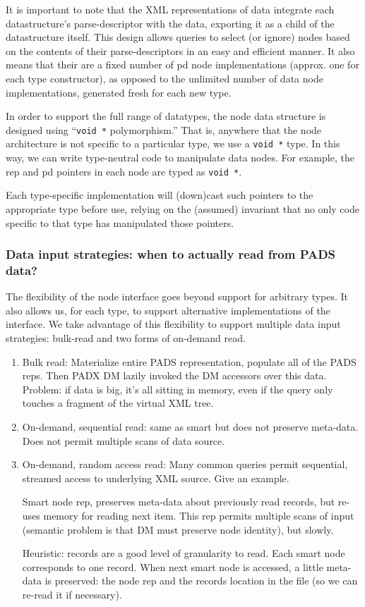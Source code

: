 It is important to note that the XML representations of \pads data
integrate each datastructure's parse-descriptor with the data,
exporting it as a child of the datastructure itself. This design
allows queries to select (or ignore) nodes based on the contents of
their parse-descriptors in an easy and efficient manner. It also means
that their are a fixed number of pd node implementations (approx. one for
each type constructor), as opposed to the unlimited number of data
node implementations, generated fresh for each new \pads{} type.

In order to support the full range of \pads datatypes,
the node data structure is designed using ``{\tt void *}
polymorphism.'' That is, anywhere that the node architecture is not
specific to a particular type, we use a {\tt void *} type. In this
way, we can write type-neutral code to manipulate data nodes. For
example, the rep and pd pointers in each node are typed as {\tt void
  *}. 

Each type-specific implementation will (down)cast such pointers to the
appropriate type before use, relying on the (assumed) invariant that
no only code specific to that type has manipulated those pointers.

\subsubsection{Data input strategies: when to actually read from PADS data?}

The flexibility of the node interface goes beyond support for
arbitrary \pads{} types. It also allows us, for each type, to support
alternative implementations of the interface. We take advantage of
this flexibility to support multiple data input strategies: bulk-read
and two forms of on-demand read.

\begin{enumerate}
\item Bulk read: Materialize entire PADS representation, populate all of the PADS
reps.  Then PADX DM lazily invoked the DM accessors over this data.
Problem: if data is big, it's all sitting in memory, even if the query
only touches a fragment of the virtual XML tree.

\item On-demand, sequential read: same as smart but does not preserve meta-data.
   Does not permit multiple scans of data source. 

\item On-demand, random access read: 
Many common queries permit sequential, streamed access to underlying
XML source.  Give an example.  

Smart node rep, preserves meta-data about previously read records, but
re-uses memory for reading next item.  This rep permits multiple scans
of input (semantic problem is that DM must preserve node identity),
but slowly. 

Heuristic: records are a good level of granularity to read.   Each
smart node corresponds to one record.  When next smart node is
accessed, a little meta-data is preserved: the node rep and the
records location in the file (so we can re-read it if necessary).
\end{enumerate}

